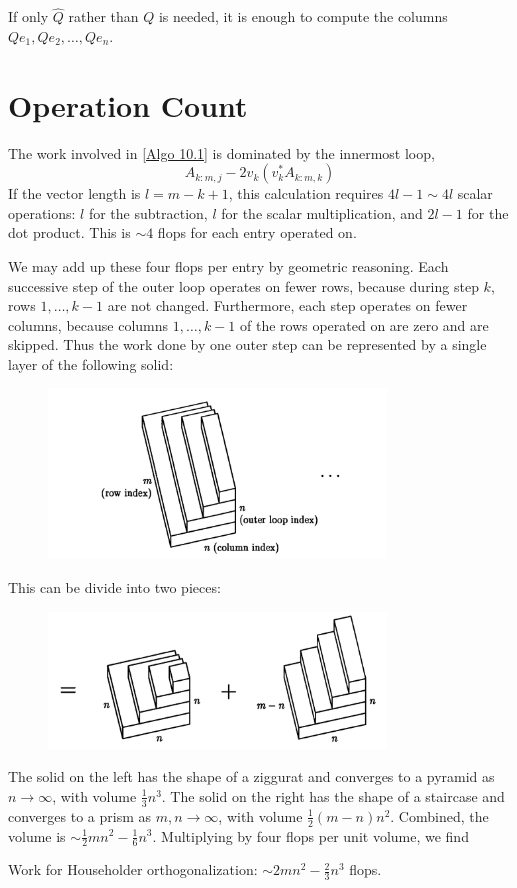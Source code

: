 If only $\hat{Q}$ rather than $Q$ is needed, it is enough to compute the columns $Q e_1, Q e_2, \ldots, Q e_n$.

\section{Operation Count} 
The work involved in \autoref{Algo 10.1} is dominated by the innermost loop,
$$
A_{k: m, j}-2 v_k\left(v_k^* A_{k: m, k}\right)
$$
If the vector length is $l=m-k+1$, this calculation requires $4 l-1 \sim 4 l$ scalar operations: $l$ for the subtraction, $l$ for the scalar multiplication, and $2 l-1$ for the dot product. This is $\sim 4$ flops for each entry operated on.

We may add up these four flops per entry by geometric reasoning. Each successive step of the outer loop operates on fewer rows, because during step $k$, rows $1, \ldots, k-1$ are not changed. Furthermore, each step operates on fewer columns, because columns $1, \ldots, k-1$ of the rows operated on are zero and are skipped. Thus the work done by one outer step can be represented by a single layer of the following solid:
\begin{figure}[H]
    \centering
    \includegraphics[width=0.8\textwidth]{figures/10-4.png}
\end{figure}
This can be divide into two pieces: 

\begin{figure}[H]
    \centering
    \includegraphics[width=0.8\textwidth]{figures/10-5.png}
\end{figure}
The solid on the left has the shape of a ziggurat and converges to a pyramid as $n \rightarrow \infty$, with volume $\frac{1}{3} n^3$. The solid on the right has the shape of a staircase and converges to a prism as $m, n \rightarrow \infty$, with volume $\frac{1}{2}(m-n) n^2$. Combined, the volume is $\sim \frac{1}{2} m n^2-\frac{1}{6} n^3$. Multiplying by four flops per unit volume, we find

\begin{corollary}
     Work for Householder orthogonalization: $ \sim 2 m n^2-\frac{2}{3} n^3$  flops. 
\end{corollary}